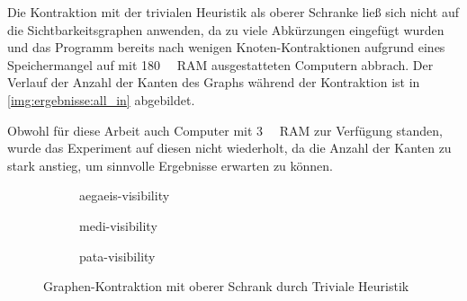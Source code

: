 Die Kontraktion mit der trivialen Heuristik als oberer Schranke ließ sich nicht auf die Sichtbarkeitsgraphen anwenden, da zu viele Abkürzungen eingefügt wurden und das Programm bereits nach wenigen Knoten-Kontraktionen aufgrund eines Speichermangel auf mit \SI{180}{\giga\byte} RAM ausgestatteten Computern abbrach.
Der Verlauf der Anzahl der Kanten des Graphs während der Kontraktion ist in \autoref{img:ergebnisse:all_in} abgebildet.

Obwohl für diese Arbeit auch Computer mit \SI{3}{\tera\byte} RAM  zur Verfügung standen, wurde das Experiment auf diesen nicht wiederholt, da die Anzahl der Kanten zu stark anstieg, um sinnvolle Ergebnisse erwarten zu können.

\begin{figure}[p]%
  \begin{subfigure}[b]{0.5\textwidth}
    \caption{aegaeis-visibility}%
  \end{subfigure}%
  \begin{subfigure}[b]{0.5\textwidth}%
    \caption{medi-visibility}%
  \end{subfigure}%
  \par%
  \begin{subfigure}[b]{0.5\textwidth}%
    \caption{pata-visibility}
  \end{subfigure}
  \caption{Graphen-Kontraktion mit oberer Schrank durch Triviale Heuristik}
  \label{img:ergebnisse:all_in}
\end{figure}

